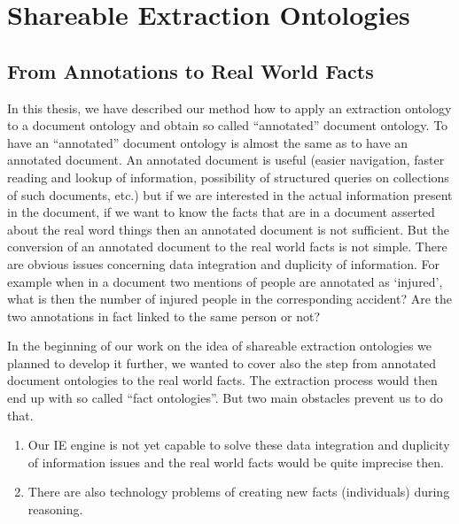 \section{Shareable Extraction Ontologies} 

\subsection{From Annotations to Real World Facts} \label{sec:onto_discuss}


In this thesis, we have described our method how to apply an extraction ontology to a document ontology and obtain so called ``annotated'' document ontology. To have an ``annotated'' document ontology is almost the same as to have an annotated document. An annotated document is useful (easier navigation, faster reading and lookup of information, possibility of structured queries on collections of such documents, etc.) but if we are interested in the actual information present in the document, if we want to know the facts that are in a document asserted about the real word things then an annotated document is not sufficient. But the conversion of an annotated document to the real world facts is not simple.
There are obvious issues concerning data integration and duplicity of information. For example when in a document two mentions of people are annotated as `injured', what is then the number of injured people in the corresponding accident? Are the two annotations in fact linked to the same person or not?

In the beginning of our work on the idea of shareable extraction ontologies we planned to develop it further, we wanted to cover also the step from annotated document ontologies to the real world facts. The extraction process would then end up with so called ``fact ontologies''. But two main obstacles prevent us to do that.

\begin{enumerate}
	\item Our IE engine is not yet capable to solve these data integration and duplicity of information issues and the real world facts would be quite imprecise then.
	\item There are also technology problems of creating new facts (individuals) during reasoning.
\end{enumerate}

